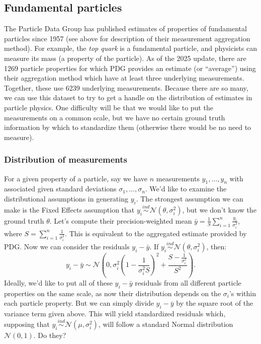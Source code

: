 \documentclass[12pt]{article}
\begin{document}
\subsection{Fundamental particles}\label{fundamental-particles}

The Particle Data Group has published estimates of properties of fundamental particles since 1957 (see above for description of their measurement aggregation method). For example, the \emph{top quark} is a fundamental particle, and physicists can measure its mass (a property of the particle). As of the 2025 update, there are 1269 particle properties for which PDG provides an estimate (or ``average'') using their aggregation method which have at least three underlying measurements. Together, these use 6239 underlying measurements. Because there are so many, we can use this dataset to try to get a handle on the distribution of estimates in particle physics. One difficulty will be that we would like to put the measurements on a common scale, but we have no certain ground truth information by which to standardize them (otherwise there would be no need to measure).

\subsubsection{Distribution of measurements}\label{distribution-of-measurements}

For a given property of a particle, say we have $n$ measurements $y_1,\ldots,y_n$ with associated given standard deviations $\sigma_1,\ldots,\sigma_n$. We'd like to examine the distributional assumptions in generating $y_i$. The strongest assumption we can make is the Fixed Effects assumption that $y_i\overset{ind}{\sim}\mathcal{N}(\theta,\sigma_i^2)$, but we don't know the ground truth $\theta$. Let's compute their precision-weighted mean $\bar{y}=\frac{1}{S}\sum_{i=1}^n\frac{y_i}{\sigma_i^2}$, where $S=\sum_{i=1}^n \frac{1}{\sigma_i^2}$. This is equivalent to the aggregated estimate provided by PDG. Now we can consider the residuals $y_i-\bar{y}$. If $y_i\overset{ind}{\sim}\mathcal{N}(\theta,\sigma_i^2)$, then:
\[y_i-\bar{y}\sim \mathcal{N}\left(0, \sigma_i^2(1-\frac{1}{\sigma_i^2S})^2+\frac{S-\frac{1}{\sigma_i^2}}{S^2}\right).\]
Ideally, we'd like to put all of these $y_i-\bar{y}$ residuals from all different particle properties on the same scale, as now their distribution depends on the $\sigma_i$'s within each particle property. But we can simply divide $y_i-\bar{y}$ by the square root of the variance term given above. This will yield standardized residuals which, supposing that $y_i\overset{ind}{\sim} \mathcal{N}(\mu,\sigma_i^2)$, will follow a standard Normal distribution $\mathcal{N}(0,1)$. Do they?
\end{document}
